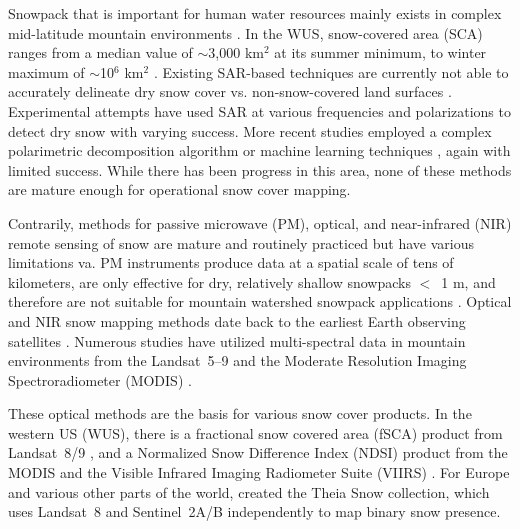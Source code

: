 Snowpack that is important for human water resources mainly exists in complex mid-latitude mountain environments \citep{barnettPotentialImpactsWarming2005}. In the WUS, snow-covered area (SCA) ranges from a median value of $\sim$3,000 km$^{2}$ at its summer minimum, to winter maximum of $\sim$10$^{6}$ km$^{2}$ \citep{rittgerSnowToday2022}. Existing SAR-based techniques are currently not able to accurately delineate dry snow cover vs. non-snow-covered land surfaces \citep{tsaiRemoteSensingSnow2019}. Experimental attempts have used SAR at various frequencies and polarizations to detect dry snow \citep{rottThematicStudiesAlpine1994, shiMappingSeasonalSnow1997} with varying success. More recent studies employed a complex polarimetric decomposition algorithm \cite{varadeIdentificationSnowUsing2020} or machine learning techniques \cite{tsaiWetDrySnow2019}, again with limited success. While there has been progress in this area, none of these methods are mature enough for operational snow cover mapping. \par

Contrarily, methods for passive microwave (PM), optical, and near-infrared (NIR) remote sensing of snow are mature and routinely practiced but have various limitations va\citep{dozierMultispectralHyperspectralRemote2004,nolinRecentAdvancesRemote2010 saberiReviewSnowWater2020}. PM instruments produce data at a spatial scale of tens of kilometers, are only effective for dry, relatively shallow snowpacks $<$~1 m, and therefore are not suitable for mountain watershed snowpack applications \citep{takalaEstimatingNorthernHemisphere2011a,pulliainenPatternsTrendsNorthern2020}. Optical and NIR snow mapping methods date back to the earliest Earth observing satellites \citep{rangoSatellitePotentialsSnowcover1976a}. Numerous studies have utilized multi-spectral data in mountain environments from the Landsat~5--9 \citep{dozierSpectralSignatureAlpine1989} and the Moderate Resolution Imaging Spectroradiometer (MODIS) \citep{painterRetrievalSubpixelSnowcovered2003, painterRetrievalSubpixelSnow2009, rittgerAssessmentMethodsMapping2013}. 

These optical methods are the basis for various snow cover products. In the western US (WUS), there is a fractional snow covered area (fSCA) product from Landsat~8/9 \citep{selkowitzUSGSLandsatSnow2017}, and a Normalized Snow Difference Index (NDSI) \citep{dozierSpectralSignatureAlpine1989, hallDevelopmentMethodsMapping1995} product from the MODIS \citep{hallMODISSnowcoverProducts2002} and the Visible Infrared Imaging Radiometer Suite (VIIRS) \citep{justiceLandCryosphereProducts2013}. For Europe and various other parts of the world, \cite{gascoinTheiaSnowCollection2019a} created the Theia Snow collection, which uses Landsat~8 and Sentinel~2A/B independently to map binary snow presence.

